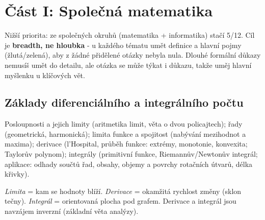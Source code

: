 \section{Část I: Společná matematika}

{\small Nižší priorita: ze společných okruhů (matematika + informatika) stačí 5/12.
Cíl je \textbf{breadth, ne hloubka} - u každého tématu umět definice a hlavní pojmy
(žlutá/zelená), aby z žádné přidělené otázky nebyla nula. Dlouhé formální důkazy nemusíš umět do detailu, ale otázka se může týkat i důkazu, takže uměj hlavní myšlenku u klíčových vět.}

\subsection{Základy diferenciálního a integrálního počtu}

\begin{tema}
Posloupnosti a jejich limity (aritmetika limit, věta o dvou policajtech); řady
(geometrická, harmonická); limita funkce a spojitost (nabývání mezihodnot a maxima);
derivace (l'Hospital, průběh funkce: extrémy, monotonie, konvexita; Taylorův polynom);
integrály (primitivní funkce, Riemannův/Newtonův integrál; aplikace: odhady součtů řad,
obsahy, objemy a povrchy rotačních útvarů, délka křivky).
\end{tema}
\begin{vezkratce}
\end{vezkratce}

\ucivo
\begin{intuice}
\emph{Limita} = kam se hodnoty blíží. \emph{Derivace} = okamžitá rychlost změny (sklon
tečny). \emph{Integrál} = orientovaná plocha pod grafem. Derivace a integrál jsou navzájem inverzní
(základní věta analýzy).
\end{intuice}

